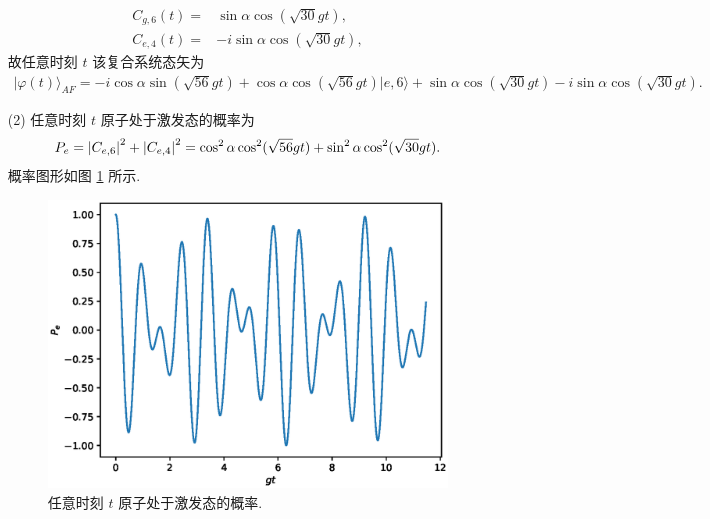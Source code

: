 \documentclass{assignment}
\begin{document}
\begin{sol}
\begin{itemize}
\begin{align}
            C_{g,6}(t)=&\sin\alpha\cos(\sqrt{30}gt),\\
            C_{e,4}(t)=&-i\sin\alpha\cos(\sqrt{30}gt),
        \end{align}
        故任意时刻 $t$ 该复合系统态矢为
        \begin{align}
            \lvert\varphi(t)\rangle_{AF}=-i\cos\alpha\sin(\sqrt{56}gt)+\cos\alpha\cos(\sqrt{56}gt)\lvert e,6\rangle+\sin\alpha\cos(\sqrt{30}gt)-i\sin\alpha\cos(\sqrt{30}gt).
        \end{align}
        \item[(2)] 任意时刻 $t$ 原子处于激发态的概率为
        \begin{align}
            P_e=\left\lvert C_{e,6}\right\rvert^2+\left\lvert C_{e,4}\right\rvert^2=\cos^2\alpha\cos^2(\sqrt{56}gt)+\sin^2\alpha\cos^2(\sqrt{30}gt).
        \end{align}
        概率图形如图 \ref{2014-5} 所示.
        \begin{figure}[H]
            \centering
            \includegraphics[width=.5\columnwidth]{Figures/2014-5.eps}
            \caption{任意时刻 $t$ 原子处于激发态的概率.}
            \label{2014-5}
        \end{figure}
    \end{itemize}
\end{sol}
\end{document}
